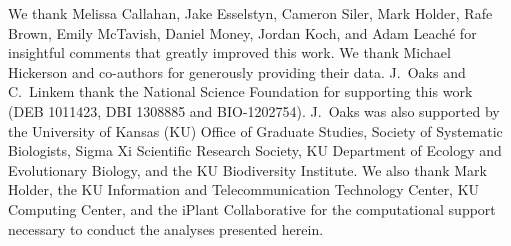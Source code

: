 We thank Melissa Callahan, Jake Esselstyn, Cameron Siler, Mark Holder, Rafe
Brown, Emily McTavish, Daniel Money, Jordan Koch, and Adam Leach\'{e} for
insightful comments that greatly improved this work.
We thank Michael Hickerson and co-authors for generously providing their data.
J.\ Oaks and C.\ Linkem thank the National Science Foundation for supporting
this work (DEB 1011423, DBI 1308885 and BIO-1202754).
J.\ Oaks was also supported by the University of Kansas (KU) Office of Graduate
Studies, Society of Systematic Biologists, Sigma Xi Scientific Research
Society, KU Department of Ecology and Evolutionary Biology, and the KU
Biodiversity Institute.
We also thank Mark Holder, the KU Information and Telecommunication Technology
Center, KU Computing Center, and the iPlant Collaborative for the computational
support necessary to conduct the analyses presented herein.
